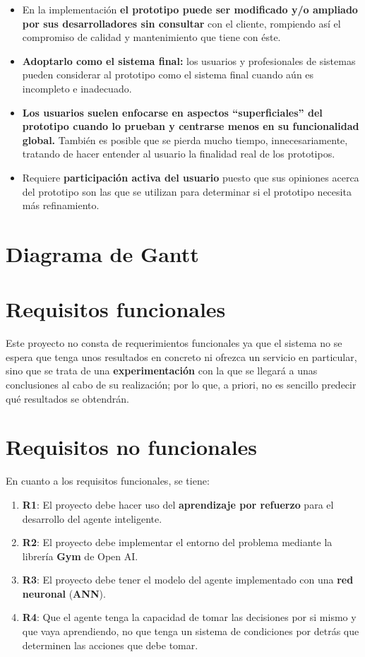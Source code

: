\begin{itemize}
    \item En la implementación \textbf{el prototipo puede ser modificado y/o ampliado por sus desarrolladores sin consultar} con el cliente, rompiendo así el compromiso de calidad y mantenimiento que tiene con éste.
    \item \textbf{Adoptarlo como el sistema final:} los usuarios y profesionales de sistemas pueden considerar al prototipo como el sistema final cuando aún es incompleto e inadecuado.
    \item \textbf{Los usuarios suelen enfocarse en aspectos “superficiales” del prototipo cuando lo prueban y centrarse menos en su funcionalidad global.} También es posible que se pierda mucho tiempo, innecesariamente, tratando de hacer entender al usuario la finalidad real de los prototipos.
    \item Requiere \textbf{participación activa del usuario} puesto que sus opiniones acerca del prototipo son las que se utilizan para determinar si el prototipo necesita más refinamiento. 
    \end{itemize}

\section{Diagrama de Gantt}

\section{Requisitos funcionales}

Este proyecto no consta de requerimientos funcionales ya que el sistema no se espera que tenga unos resultados en concreto ni ofrezca un servicio en particular, sino que se trata de una \textbf{experimentación} con la que se llegará a unas conclusiones al cabo de su realización; por lo que, a priori, no es sencillo predecir qué resultados se obtendrán. 
\section{Requisitos no funcionales}

En cuanto a los requisitos funcionales, se tiene: 

\begin{enumerate}
    \item \textbf{R1}: El proyecto debe hacer uso del \textbf{aprendizaje por refuerzo} para el desarrollo del agente inteligente.
    \item \textbf{R2}: El proyecto debe implementar el entorno del problema mediante la librería \textbf{Gym} de Open AI.
    \item \textbf{R3}: El proyecto debe tener el modelo del agente implementado con una \textbf{red neuronal} (\textbf{ANN}).
    \item \textbf{R4}: Que el agente tenga la capacidad de tomar las decisiones por si mismo y que vaya aprendiendo, no que tenga un sistema de condiciones por detrás que determinen las acciones que debe tomar.
\end{enumerate}

